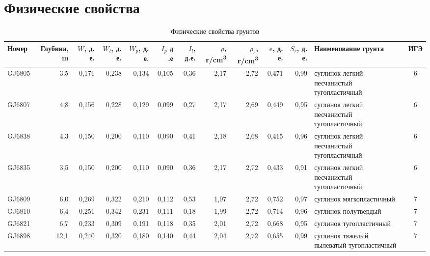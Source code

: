 \chapter{Физические свойства}\label{app:phisics}

\begin{sidewaystable}[p]
    \centering
    \tiny
    \caption{Физические свойства грунтов}
    \begin{tabular}{@{}|l|r|r|r|r|r|r|r|r|r|r|l|c|@{}}
    \hline
    Номер  & Глубина, \si{\meter} & $W$, д. е. & $W_l$, д. е. & $W_p$, д. е. & $I_p$ д .е & $I_l$, д.е. & $\rho$, г/\si{\centi\meter^3} & $\rho_s$, г/\si{\centi\meter^3} & $e$, д. е. & $S_r$, д. е. & Наименование   грунта                        & ИГЭ \\ \hline
    GJ6805          & 3,5        & 0,171                        & 0,238   & 0,134  & 0,105  & 0,36     & 2,17     & 2,72      & 0,471   & 0,99     & суглинок легкий   песчанистый тугопластичный & 6   \\ \hline
    GJ6807          & 4,8        & 0,156                        & 0,228   & 0,129  & 0,099  & 0,27     & 2,17     & 2,69      & 0,449   & 0,95     & суглинок легкий   песчанистый тугопластичный & 6   \\ \hline
    GJ6838          & 4,3        & 0,150                        & 0,200   & 0,110  & 0,090  & 0,41     & 2,18     & 2,68      & 0,415   & 0,96     & суглинок легкий   песчанистый тугопластичный & 6   \\\hline
    GJ6835          & 3,5        & 0,150                        & 0,200   & 0,110  & 0,090  & 0,36     & 2,17     & 2,72      & 0,433   & 0,91     & суглинок легкий   песчанистый тугопластичный & 6   \\ \hline
    GJ6809          & 6,0        & 0,269                        & 0,322   & 0,210  & 0,112  & 0,53     & 1,97     & 2,72      & 0,752   & 0,97     & суглинок   мягкопластичный                   & 7   \\ \hline
    GJ6810          & 6,4        & 0,251                        & 0,342   & 0,231  & 0,111  & 0,18     & 1,99     & 2,72      & 0,714   & 0,96     & суглинок полутвердый                         & 7   \\ \hline
    GJ6821          & 6,7        & 0,233                        & 0,309   & 0,191  & 0,118  & 0,35     & 2,01     & 2,72      & 0,668   & 0,95     & суглинок   тугопластичный                    & 7   \\ \hline
    GJ6898          & 12,1       & 0,240                        & 0,320   & 0,180  & 0,140  & 0,44     & 2,04     & 2,72      & 0,655   & 0,99     & суглинок тяжелый   пылеватый тугопластичный  & 7   \\ \hline

\end{tabular}
\end{sidewaystable}
